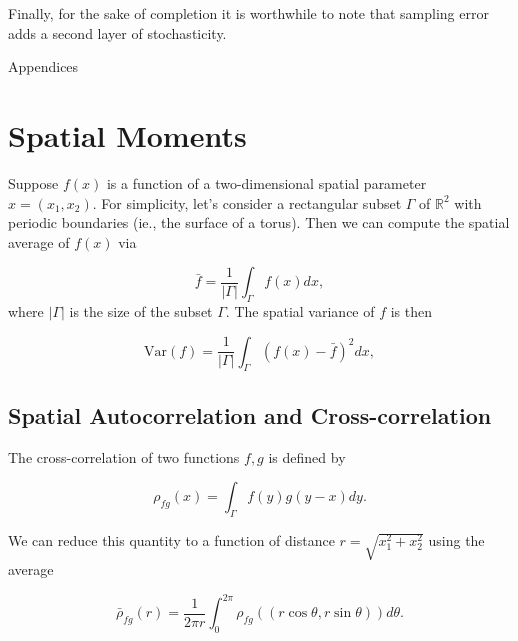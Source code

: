 \documentclass{article}
\begin{document}
Finally, for the sake of completion it is worthwhile to note that
sampling error adds a second layer of stochasticity.

\newpage

\begin{center}
  \Large Appendices
\end{center}

\appendix

\hypertarget{spatial-moments}{%
\section{Spatial Moments}\label{spatial-moments}}

Suppose \(f(x)\) is a function of a two-dimensional spatial parameter
\(x=(x_1,x_2)\). For simplicity, let's consider a rectangular subset
\(\Gamma\) of \(\mathbb R^2\) with periodic boundaries (ie., the surface
of a torus). Then we can compute the spatial average of \(f(x)\) via

\begin{equation}
  \bar f = \frac{1}{|\Gamma|}\int_\Gamma f(x)dx,
\end{equation} where \(|\Gamma|\) is the size of the subset \(\Gamma\).
The spatial variance of \(f\) is then

\begin{equation}
  \mathrm{Var}(f) = \frac{1}{|\Gamma|}\int_\Gamma (f(x)-\bar f)^2dx,
\end{equation}

\hypertarget{spatial-autocorrelation-and-cross-correlation}{%
\subsection{\texorpdfstring{Spatial Autocorrelation and
Cross-correlation
\label{corr-defs}}{Spatial Autocorrelation and Cross-correlation }}\label{spatial-autocorrelation-and-cross-correlation}}

The cross-correlation of two functions \(f,g\) is defined by

\begin{equation}
  \rho_{fg}(x)=\int_\Gamma f(y)g(y-x)dy.
\end{equation}

We can reduce this quantity to a function of distance
\(r=\sqrt{x_1^2+x_2^2}\) using the average

\begin{equation}
  \bar\rho_{fg}(r)=\frac{1}{2\pi r}\int_0^{2\pi}\rho_{fg}((r\cos\theta,r\sin\theta))d\theta.
\end{equation}
\end{document}
